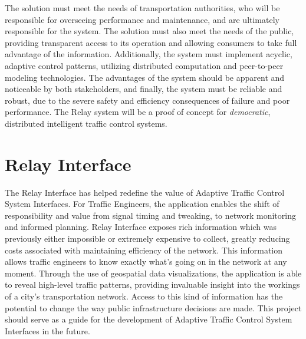 \documentclass[a4paper,10pt]{article}
\begin{document}
\begin{multicols}{2}
The solution must meet the needs of transportation authorities, who will be responsible for overseeing performance and maintenance, and are ultimately responsible for the system.
The solution must also meet the needs of the public, providing transparent access to its operation and allowing consumers to take full advantage of the information.
Additionally, the system must implement acyclic, adaptive control patterns, utilizing distributed computation and peer-to-peer modeling technologies.
The advantages of the system should be apparent and noticeable by both stakeholders, and finally, the system must be reliable and robust, due to the severe safety and efficiency consequences of failure and poor performance. 
The Relay system will be a proof of concept for \emph{democratic}, distributed intelligent traffic control systems.

\section{Relay Interface}


The Relay Interface has helped redefine the value of Adaptive Traffic Control System Interfaces. For Traffic Engineers, the application enables the shift of responsibility and value from signal timing and tweaking, to network monitoring and informed planning. Relay Interface exposes rich information which was previously either impossible or extremely expensive to collect, greatly reducing costs associated with maintaining efficiency of the network. This information allows traffic engineers to know exactly what's going on in the network at any moment. Through the use of geospatial data visualizations, the application is able to reveal high-level traffic patterns, providing invaluable insight into the workings of a city's transportation network. Access to this kind of information has the potential to change the way public infrastructure decisions are made. This project should serve as a guide for the development of Adaptive Traffic Control System Interfaces in the future.


\end{multicols}
\end{document}
